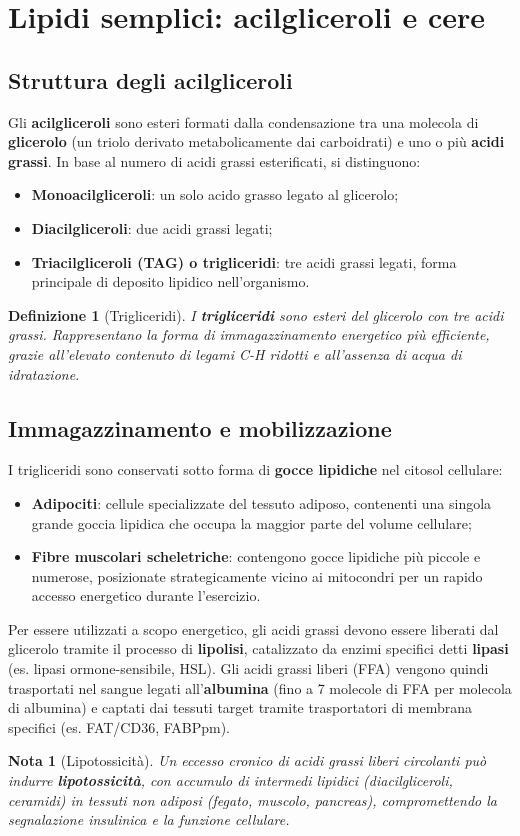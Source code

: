\documentclass[12pt,a4paper]{report}
\newtheorem{definizione}{Definizione}[section]
\newtheorem{nota}{Nota}[section]
\begin{document}
\section{Lipidi semplici: acilgliceroli e cere}
\subsection{Struttura degli acilgliceroli}
Gli \textbf{acilgliceroli} sono esteri formati dalla condensazione tra una molecola di \textbf{glicerolo} (un triolo derivato metabolicamente dai carboidrati) e uno o più \textbf{acidi grassi}. In base al numero di acidi grassi esterificati, si distinguono:
\begin{itemize}
\item \textbf{Monoacilgliceroli}: un solo acido grasso legato al glicerolo;
\item \textbf{Diacilgliceroli}: due acidi grassi legati;
\item \textbf{Triacilgliceroli (TAG) o trigliceridi}: tre acidi grassi legati, forma principale di deposito lipidico nell'organismo.
\end{itemize}
\begin{definizione}[Trigliceridi]
I \textbf{trigliceridi} sono esteri del glicerolo con tre acidi grassi. Rappresentano la forma di immagazzinamento energetico più efficiente, grazie all'elevato contenuto di legami C-H ridotti e all'assenza di acqua di idratazione.
\end{definizione}
\subsection{Immagazzinamento e mobilizzazione}
I trigliceridi sono conservati sotto forma di \textbf{gocce lipidiche} nel citosol cellulare:
\begin{itemize}
\item \textbf{Adipociti}: cellule specializzate del tessuto adiposo, contenenti una singola grande goccia lipidica che occupa la maggior parte del volume cellulare;
\item \textbf{Fibre muscolari scheletriche}: contengono gocce lipidiche più piccole e numerose, posizionate strategicamente vicino ai mitocondri per un rapido accesso energetico durante l'esercizio.
\end{itemize}
Per essere utilizzati a scopo energetico, gli acidi grassi devono essere liberati dal glicerolo tramite il processo di \textbf{lipolisi}, catalizzato da enzimi specifici detti \textbf{lipasi} (es. lipasi ormone-sensibile, HSL). Gli acidi grassi liberi (FFA) vengono quindi trasportati nel sangue legati all'\textbf{albumina} (fino a 7 molecole di FFA per molecola di albumina) e captati dai tessuti target tramite trasportatori di membrana specifici (es. FAT/CD36, FABPpm).
\begin{nota}[Lipotossicità]
Un eccesso cronico di acidi grassi liberi circolanti può indurre \textbf{lipotossicità}, con accumulo di intermedi lipidici (diacilgliceroli, ceramidi) in tessuti non adiposi (fegato, muscolo, pancreas), compromettendo la segnalazione insulinica e la funzione cellulare.
\end{nota}
\end{document}
